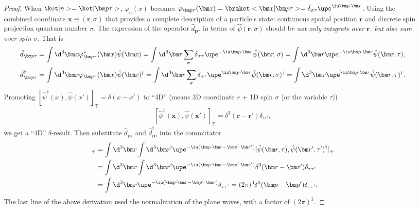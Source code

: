 \begin{solution}
\begin{proof}
  When $\ket|n> = \ket|\bm p\tau>$,
  $\varphi_n(x)$ becomes $\varphi_{\bm p\tau} (\bm x) =
  \braket<\bm x|\bm p\tau> = \delta_{\sigma\tau} \upe^{\iu\bm p\cdot\bm r}$.
  Using the combined coordinate $\bm x \equiv (\bm r, \sigma)$ that
  provides a complete description of a particle's state:
  continuous spatial position $\bm r$ and
  discrete spin projection quantum number $\sigma$.
  The expression of the operator $\hat d_{\bm p\tau}$ in terms of
  $\hat\psi(\bm r, \sigma)$ should be
  \emph{not only integrate over $\bm r$, but also sum over spin $\sigma$}.
  That is
  \begin{align*}
    \hat d_{\bm p\tau} &
  = \int \d^3 \bm x
    \varphi_{\bm p\tau}^*(\bm x)  \hat\psi(\bm x)
  = \int \d^3 \bm r \sum_\sigma \delta_{\sigma\tau}
    \upe^{-\iu \bm p\cdot\bm r} \hat\psi(\bm r,\sigma)
  = \int \d^3 \bm r \upe^{-\iu \bm p\cdot\bm r} \hat\psi(\bm r,\tau),\\
    \hat d_{\bm p\tau}^\dagger &
  = \int \d^3 \bm x
    \varphi_{\bm p\tau}(\bm x)  \hat\psi(\bm x)^\dagger
  = \int \d^3 \bm r \sum_\sigma \delta_{\sigma\tau}
    \upe^{\iu \bm p\cdot\bm r} \hat\psi(\bm r,\sigma)^\dagger
  = \int \d^3 \bm r \upe^{\iu \bm p\cdot\bm r} \hat\psi(\bm r,\tau)^\dagger.
  \end{align*}
  Promoting $[\hat\psi^\dagger(x), \hat\psi(x')]_\mp = \delta(x - x')$ to
  ``4D'' (means 3D coordinate $r$ + 1D spin $\sigma$ (or the variable $\tau$))
  \[
    [\hat\psi^\dagger(\bm x), \hat\psi(\bm x')]_\mp
  = \delta^3(\bm r - \bm r') \delta_{\tau\tau'},
  \]
  we get a ``4D'' $\delta$-result.
  Then substitute $\hat d_{\bm p\tau}$ and $\hat d_{\bm p\tau}^\dagger$
  into the commutator
  \begin{align*}
    [\hat d_{\bm p\tau}, \hat d_{\bm p',\tau'}^\dagger]_\mp
& = \int \d^3\bm r \int \d^3\bm r'
    \upe^{-\iu (\bm p\cdot\bm r-\bm p'\cdot\bm r')}
    [\hat\psi(\bm r,\tau), \hat\psi(\bm r',\tau')^\dagger]_\mp\\
& = \int \d^3\bm r \int \d^3\bm r'
    \upe^{-\iu (\bm p\cdot\bm r-\bm p'\cdot\bm r')}
    \delta^3(\bm r - \bm r') \delta_{\tau\tau'}\\
& = \int \d^3\bm r \upe^{-\iu (\bm p\cdot\bm r-\bm p'\cdot\bm r)}
    \delta_{\tau\tau'}
  = (2\pi)^3 \delta^3(\bm p - \bm p') \delta_{\tau\tau'}.
  \end{align*}
  The last line of the above derivation used
  the normalization of the plane waves, with a factor of $(2\pi)^3$.

\end{proof}
\end{solution}
